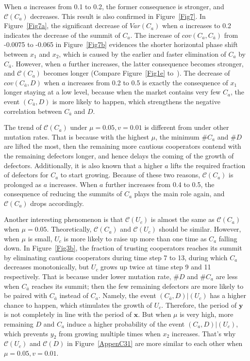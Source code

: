 \documentclass[letterpaper,10pt]{article}
\numberwithin{equation}{section}
\begin{document}
When $ a $ increases from 0.1 to 0.2, the former consequence is stronger, and $ \mathscr{C}(C_{a}) $ decreases. This result is also confirmed in Figure~\ref{Fig7}. In Figure~\ref{Fig7a}, the significant decrease of $ Var(C_{a}) $ when $ a $ increases to 0.2 indicates the decrease of the summit of $ C_{a} $. The increase of $ cov(C_{a}, C_{\bar{a}}) $ from -0.0075 to -0.065 in Figure~\ref{Fig7b} evidences the shorter horizontal phase shift between $ x_{1} $ and $ x_{2} $, which is caused by the earlier and faster elimination of $ C_{a} $ by $ C_{\bar{a}} $. However, when $ a $ further increases, the latter consequence becomes stronger, and $ \mathscr{C}(C_{a}) $ becomes longer (Compare Figure~\ref{Fig1e} to~). The decrease of $ cov(C_{\bar{a}}, D) $ when $ a $ increases from 0.2 to 0.5 is exactly the consequence of $ x_{1} $ longer staying at a low level, because when the market contains very few $ C_{a} $, the event $ (C_{\bar{a}}, D) $ is more likely to happen, which strengthens the negative correlation between $ C_{\bar{a}} $ and $ D $.

The trend of $ \mathscr{C}(C_{a}) $ under $ \mu = 0.05, v = 0.01 $ is different from under other mutation rates. That is because with the highest $ \mu $, the minimum \#$ C_{a} $ and \#$ D $ are lifted the most, then the remaining more cautious cooperators contend with the remaining defectors longer, and hence delays the coming of the growth of defectors. Additionally, it is also known that a higher $ a $ lifts the required fraction of defectors for $ C_{a} $ to start growing. Because of these two reasons, $ \mathscr{C}(C_{a}) $ is prolonged as $ a $ increases. When $ a $ further increases from 0.4 to 0.5, the consequence of reducing the summits of $ C_{a} $ plays the main role again, and $ \mathscr{C}(C_{a}) $ drops accordingly.

Another interesting phenomenon is that $ \mathscr{C}(U_{c}) $ is almost the same as $ \mathscr{C}(C_{a}) $ when $ \mu = 0.05 $. Theoretically, $ \mathscr{C}(C_{a}) $ and $ \mathscr{C}(U_{c}) $ should be similar. However, when $ \mu $ is small, $ U_{c} $ is more likely to raise up more than one time as $ C_{a} $ falling down. In Figure~\ref{Fig3b}, the fraction of trusting cooperators reaches its summit by eliminating cautious cooperators during time step 7 to 13, during which $ C_{a} $ decreases monotonically, but $ U_{c} $ grows up twice at time step 9 and 11 respectively. That is because under lower mutation rate, \#$ D $ and \#$ C_{a} $ are less when $ C_{\bar{a}} $ reaches its summit; then the few remaining defectors are more likely to be paired with $ C_{\bar{a}} $ instead of $ C_{a} $. Namely, the event $ (C_{\bar{a}}, D)|(U_{c}) $ has a higher chance to happen, which stimulates the growth of $ U_{c} $. Therefore, the period of $ \mathbf{y} $ is not completely in line with the period of $ \mathbf{x} $. But when $ \mu $ is very high, more remaining $ D $ and $ C_{a} $ induce a higher probability of the event $ (C_{a}, D)|(U_{c}) $, which prevents $ y_{2} $ from growing multiple times when $ x_{2} $ increases. That's why $ \mathscr{C}(U_{c}) $ and $ \mathscr{C}(D) $ in Figure~\ref{AppenC31} are more similar to each other when $ \mu = 0.05, v = 0.01 $.
\end{document}
